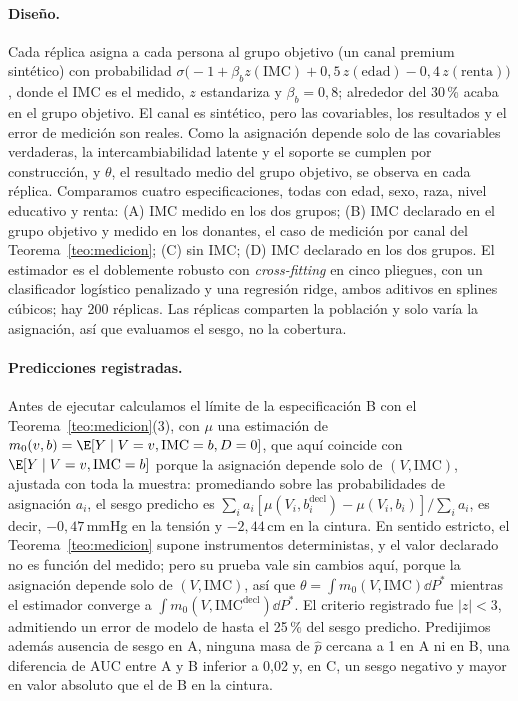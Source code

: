 \paragraph{Diseño.} Cada réplica asigna a cada persona al grupo objetivo (un canal premium sintético) con probabilidad $\sigma\bigl(-1+\beta_b z(\mathrm{IMC})+0,5\,z(\mathrm{edad})-0,4\,z(\mathrm{renta})\bigr)$, donde el IMC es el medido, $z$ estandariza y $\beta_b=0,8$; alrededor del 30\,\% acaba en el grupo objetivo. El canal es sintético, pero las covariables, los resultados y el error de medición son reales. Como la asignación depende solo de las covariables verdaderas, la intercambiabilidad latente y el soporte se cumplen por construcción, y $\theta$, el resultado medio del grupo objetivo, se observa en cada réplica. Comparamos cuatro especificaciones, todas con edad, sexo, raza, nivel educativo y renta: (A) IMC medido en los dos grupos; (B) IMC declarado en el grupo objetivo y medido en los donantes, el caso de medición por canal del Teorema~\ref{teo:medicion}; (C) sin IMC; (D) IMC declarado en los dos grupos. El estimador es el doblemente robusto con \emph{cross-fitting} en cinco pliegues, con un clasificador logístico penalizado y una regresión ridge, ambos aditivos en splines cúbicos; hay 200 réplicas. Las réplicas comparten la población y solo varía la asignación, así que evaluamos el sesgo, no la cobertura.

\paragraph{Predicciones registradas.} Antes de ejecutar calculamos el límite de la especificación B con el Teorema~\ref{teo:medicion}(3), con $\mu$ una estimación de $m_0(v,b)=\E[Y\mid V=v,\mathrm{IMC}=b,D=0]$, que aquí coincide con $\E[Y\mid V=v,\mathrm{IMC}=b]$ porque la asignación depende solo de $(V,\mathrm{IMC})$, ajustada con toda la muestra: promediando sobre las probabilidades de asignación $a_i$, el sesgo predicho es $\sum_ia_i[\mu(V_i,b_i^{\mathrm{decl}})-\mu(V_i,b_i)]/\sum_ia_i$, es decir, $-0,47$\,mmHg en la tensión y $-2,44$\,cm en la cintura. En sentido estricto, el Teorema~\ref{teo:medicion} supone instrumentos deterministas, y el valor declarado no es función del medido; pero su prueba vale sin cambios aquí, porque la asignación depende solo de $(V,\mathrm{IMC})$, así que $\theta=\int m_0(V,\mathrm{IMC})\dd P^*$ mientras el estimador converge a $\int m_0(V,\mathrm{IMC}^{\mathrm{decl}})\dd P^*$. El criterio registrado fue $|z|<3$, admitiendo un error de modelo de hasta el 25\,\% del sesgo predicho. Predijimos además ausencia de sesgo en A, ninguna masa de $\hat p$ cercana a 1 en A ni en B, una diferencia de AUC entre A y B inferior a 0,02 y, en C, un sesgo negativo y mayor en valor absoluto que el de B en la cintura.

